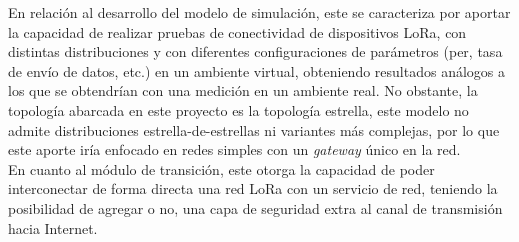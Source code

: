 \begin{justify}
\noindent
En relación al desarrollo del modelo de simulación, este se caracteriza por aportar la capacidad de realizar pruebas de conectividad de dispositivos LoRa, con distintas distribuciones y con diferentes configuraciones de parámetros (\gls{per}, tasa de envío de datos, etc.) en un ambiente virtual, obteniendo resultados análogos a los que se obtendrían con una medición en un ambiente real. No obstante, la topología abarcada en este proyecto es la topología estrella, este modelo no admite distribuciones estrella-de-estrellas ni variantes más complejas, por lo que este aporte iría enfocado en redes simples con un \textit{gateway} único en la red.\\
En cuanto al módulo de transición, este otorga la capacidad de poder interconectar de forma directa una red LoRa con un servicio de red, teniendo la posibilidad de agregar o no, una capa de seguridad extra al canal de transmisión hacia Internet.
\end{justify}